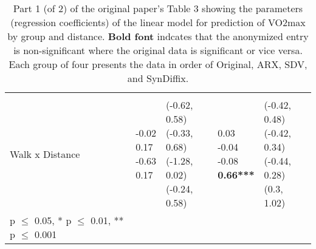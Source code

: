 \documentclass[10pt]{article}
\begin{document}
\begin{table}
\begin{center}
\begin{small}
\begin{tabular}{lllll}
& & & & \\ 
\quad Walk x Distance    &  \makecell[l]{\textnormal{-0.02\phantom{***}} \\\textnormal{0.17\phantom{***}} \\\textnormal{-0.63\phantom{***}} \\\textnormal{0.17\phantom{***}} \\}   &  \makecell[l]{\textnormal{(-0.62, 0.58)} \\\textnormal{(-0.33, 0.68)} \\\textnormal{(-1.28, 0.02)} \\\textnormal{(-0.24, 0.58)} \\}   &  \makecell[l]{\textnormal{0.03\phantom{***}} \\\textnormal{-0.04\phantom{***}} \\\textnormal{-0.08\phantom{***}} \\\textbf{0.66***} \\}   &  \makecell[l]{\textnormal{(-0.42, 0.48)} \\\textnormal{(-0.42, 0.34)} \\\textnormal{(-0.44, 0.28)} \\\textnormal{(0.3, 1.02)} \\} \\ 

      \bottomrule
      {\footnotesize * p $\leq$ 0.05, \quad** p $\leq$ 0.01, \quad*** p $\leq$ 0.001}
      \end{tabular}
      \end{small}
      \caption{Part 1 (of 2) of the original paper's Table 3 showing the parameters (regression coefficients) of the linear model for prediction of VO2max by group and distance. \textbf{Bold font} indcates that the anonymized entry is non-significant where the original data is significant or vice versa. Each group of four presents the data in order of Original, ARX, SDV, and SynDiffix. 
      }
      \label{tab:table3a}
      \end{center}
      \end{table}
      \setlength{\fboxsep}{3pt}
    
\end{document}
